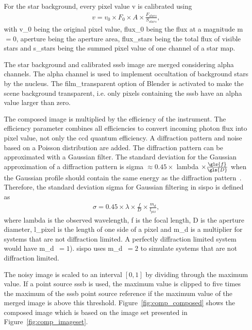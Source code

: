 For the star background, every pixel value \gls{v} is calibrated using
\begin{align}
        v = v_0 \times F_0 \times A \times \frac{F_{stars}}{S_{stars}}, \label{eq:comp_cal_starmap}
\end{align}
with \gls{v_0} being the original pixel value, \gls{flux_0} being the flux at a magnitude \gls{m}$ = 0$, \gls{aperture} being the aperture area, \gls{flux_stars} being the total flux of visible stars and \gls{s_stars} being the summed pixel value of one channel of a star map.

The star background and calibrated \gls{sssb} image are merged considering alpha channels. The alpha channel is used to implement occultation of background stars by the nucleus. The film\_transparent option of Blender is activated to make the scene background transparent, i.e. only pixels containing the \gls{sssb} have an alpha value larger than zero.

The composed image is multiplied by the efficiency of the instrument. The efficiency parameter combines all efficiencies to convert incoming photon flux into pixel value, not only the \gls{ccd} quantum efficiency. A diffraction pattern and noise based on a Poisson distribution are added. The diffraction pattern can be approximated with a Gaussian filter. The standard deviation for the Gaussian approximation of a diffraction pattern is \gls{sigma} $\approx 0.45 \times$ \gls{lambda} $\times \frac{\gls{f}}{\gls{D}}$ when the Gaussian profile should contain the same energy as the diffraction pattern~\cite{Zhang2007GaussianModels}. Therefore, the standard deviation \gls{sigma} for Gaussian filtering in \gls{sispo} is defined as
\begin{align}
    \sigma = 0.45 \times \lambda \times \frac{f}{D} \times \frac{m_d}{l_{pix}}, \label{eq:comp_sigma}
\end{align}
where \gls{lambda} is the observed wavelength, \gls{f} is the focal length, \gls{D} is the aperture diameter, \gls{l_pixel} is the length of one side of a pixel and \gls{m_d} is a multiplier for systems that are not diffraction limited. A perfectly diffraction limited system would have \gls{m_d}~$= 1$). \Gls{sispo} uses \gls{m_d}~$= 2$ to simulate systems that are not diffraction limited. 

The noisy image is scaled to an interval $[0,1]$ by dividing through the maximum value. If a point source \gls{sssb} is used, the maximum value is clipped to five times the maximum of the \gls{sssb} point source reference if the maximum value of the merged image is above this threshold. Figure~\ref{fig:comp_composed} shows the composed image which is based on the image set presented in Figure~\ref{fig:comp_imageset}.

